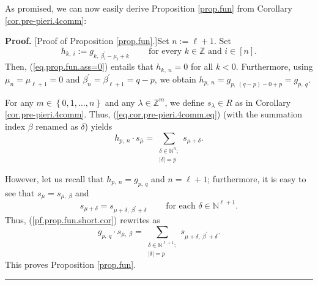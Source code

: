 \documentclass[numbers=enddot,12pt,final,onecolumn,notitlepage,english]{scrartcl}%
\theoremstyle{definition}
\newenvironment{proof}[1][Proof]{\noindent\textbf{#1.} }{\ \rule{0.5em}{0.5em}}
\let\sumnonlimits\sum
\renewcommand{\sum}{\sumnonlimits\limits}
\newenvironment{vershort}{}{}
\begin{document}
As promised, we can now easily derive Proposition \ref{prop.fun} from
Corollary \ref{cor.pre-pieri.4comm}:

\begin{vershort}
\begin{proof}
[Proof of Proposition \ref{prop.fun}.]Set $n:=\ell+1$. Set%
\[
h_{k,\ i}:=g_{k,\ \beta_{i}^{\prime}-\mu_{i}+k}\ \ \ \ \ \ \ \ \ \ \text{for
every }k\in\mathbb{Z}\text{ and }i\in\left[  n\right]  .
\]
Then, (\ref{eq.prop.fun.ass=0}) entails that $h_{k,\ n}=0$ for all $k<0$.
Furthermore, using $\mu_{n}=\mu_{\ell+1}=0$ and $\beta_{n}^{\prime}%
=\beta_{\ell+1}^{\prime}=q-p$, we obtain $h_{p,\ n}=g_{p,\ \left(  q-p\right)
-0+p}=g_{p,\ q}$.

For any $m\in\left\{  0,1,\ldots,n\right\}  $ and any $\lambda\in
\mathbb{Z}^{m}$, we define $s_{\lambda}\in R$ as in Corollary
\ref{cor.pre-pieri.4comm}. Thus, (\ref{eq.cor.pre-pieri.4comm.eq}) (with the
summation index $\beta$ renamed as $\delta$) yields%
\begin{equation}
h_{p,\ n}\cdot s_{\overline{\mu}}=\sum_{\substack{\delta\in\mathbb{N}%
^{n};\\\left\vert \delta\right\vert =p}}s_{\mu+\delta}.
\label{pf.prop.fun.short.cor}%
\end{equation}


However, let us recall that $h_{p,\ n}=g_{p,\ q}$ and $n=\ell+1$; furthermore,
it is easy to see that $s_{\overline{\mu}}=s_{\overline{\mu},\ \beta}$ and%
\[
s_{\mu+\delta}=s_{\mu+\delta,\ \beta^{\prime}+\delta}%
\ \ \ \ \ \ \ \ \ \ \text{for each }\delta\in\mathbb{N}^{\ell+1}.
\]
Thus, (\ref{pf.prop.fun.short.cor}) rewrites as
\[
g_{p,\ q}\cdot s_{\overline{\mu},\ \beta}=\sum_{\substack{\delta\in
\mathbb{N}^{\ell+1};\\\left\vert \delta\right\vert =p}}s_{\mu+\delta
,\ \beta^{\prime}+\delta}.
\]
This proves Proposition \ref{prop.fun}.
\end{proof}
\end{vershort}
\end{document}
